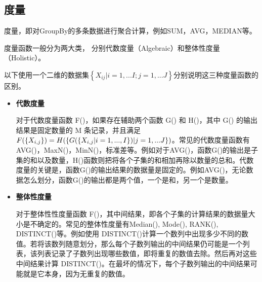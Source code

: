 

\subsection{度量}

度量，即对GroupBy的多条数据进行聚合计算，例如SUM，AVG，MEDIAN等。

度量函数一般分为两大类， 分别代数度量（Algebraic）和整体性度量（Holistic）。

以下使用一个二维的数据集$\left\{ {X}_{ij}|i=1,...I; j=1,...J \right\}$分别说明这三种度量函数的区别。

\begin{itemize}


\item \textbf{代数度量}

对于代数度量函数 F()，如果存在辅助两个函数 G() 和 H()，其中 G() 的输出结果是固定数量的 M 条记录，并且满足$F(\text\{ {X}_{i,j} \text\}) = H(\text\{ G(\text\{ {X}_{i,j}|i=1,...,I \text\})|j=1,...J \text\})$。常见的代数度量函数有AVG()，MaxN()，MinN()，标准差等。例如对于AVG()，函数G()的输出是子集的和以及数量，H()函数则把将各个子集的和相加再除以数量的总和。代数度量的关键是，函数G()的输出结果的数据量是固定的。例如AVG()，无论数据怎么划分，函数G()的输出都是两个值，一个是和，另一个是数量。

\item \textbf{整体性度量}

对于整体性性度量函数 F()，其中间结果，即各个子集的计算结果的数据量大小是不确定的。常见的整体性度量有Median(), Mode(), RANK(), DISTINCT()等。例如使用 DISTINCT()计算一个数列中出现多少不同的数值。若将该数列随意划分，那么每个子数列输出的中间结果仍可能是一个列表，该列表记录了子数列出现哪些数值，即将重复的数值去除。然后再对这些中间结果计算 DISTINCT()。在最坏的情况下，每个子数列输出的中间结果可能就是它本身，因为无重复的数值。

\end{itemize}

